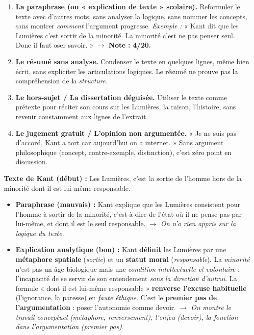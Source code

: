 \documentclass[11pt]{article}
\begin{document}
\begin{attention}
\begin{enumerate}
    \item \textbf{La paraphrase (ou « explication de texte » scolaire).} Reformuler le texte avec d'autres mots, sans analyser la logique, sans nommer les concepts, sans montrer \emph{comment} l'argument progresse. \emph{Exemple :} « Kant dit que les Lumières c'est sortir de la minorité. La minorité c'est ne pas penser seul. Donc il faut oser savoir. » $\rightarrow$ \textbf{Note : 4/20.}
    \item \textbf{Le résumé sans analyse.} Condenser le texte en quelques lignes, même bien écrit, sans expliciter les articulations logiques. Le résumé ne prouve pas la compréhension de la \emph{structure}.
    \item \textbf{Le hors-sujet / La dissertation déguisée.} Utiliser le texte comme prétexte pour réciter son cours sur les Lumières, la raison, l'histoire, sans revenir constamment aux lignes de l'extrait.
    \item \textbf{Le jugement gratuit / L'opinion non argumentée.} « Je ne suis pas d'accord, Kant a tort car aujourd'hui on a internet. » Sans argument philosophique (concept, contre-exemple, distinction), c'est zéro point en discussion.
\end{enumerate}
\end{attention}

\begin{exemplebox}
\textbf{Texte de Kant (début) :} \guillemotleft Les Lumières, c'est la sortie de l'homme hors de la minorité dont il est lui-même responsable. \guillemotright

\begin{itemize}
    \item \textbf{Paraphrase (mauvais) :} \guillemotleft Kant explique que les Lumières consistent pour l'homme à sortir de la minorité, c'est-à-dire de l'état où il ne pense pas par lui-même, et dont il est le seul responsable. \guillemotright $\rightarrow$ \emph{On n'a rien appris sur la logique du texte.}
    \item \textbf{Explication analytique (bon) :} \guillemotleft Kant \textbf{définit} les Lumières par une \textbf{métaphore spatiale} (\emph{sortie}) et un \textbf{statut moral} (\emph{responsable}). La \emph{minorité} n'est pas un âge biologique mais une \emph{condition intellectuelle et volontaire} : l'incapacité de se servir de son entendement \emph{sans la direction d'autrui}. La formule « dont il est lui-même responsable » \textbf{renverse l'excuse habituelle} (l'ignorance, la paresse) en \emph{faute éthique}. C'est le \textbf{premier pas de l'argumentation} : poser l'autonomie comme devoir. \guillemotright $\rightarrow$ \emph{On montre le travail conceptuel (métaphore, renversement), l'enjeu (devoir), la fonction dans l'argumentation (premier pas).}
\end{itemize}
\end{exemplebox}
\end{document}
